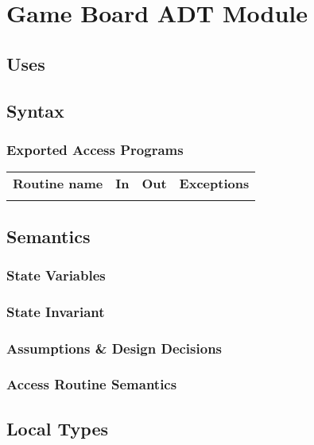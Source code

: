 \documentclass[12pt]{article}
\begin{document}
\section* {Game Board ADT Module}

\subsection* {Uses}

\subsection* {Syntax}

\subsubsection* {Exported Access Programs}

\begin{tabular}{| l | l | l | l |}
\hline
\textbf{Routine name} & \textbf{In} & \textbf{Out} & \textbf{Exceptions}\\
& & &\\
\hline
\end{tabular}

\subsection* {Semantics}

\subsubsection* {State Variables}

\subsubsection* {State Invariant}

\subsubsection* {Assumptions \& Design Decisions}

\subsubsection* {Access Routine Semantics}

\subsection*{Local Types}
\end{document}

